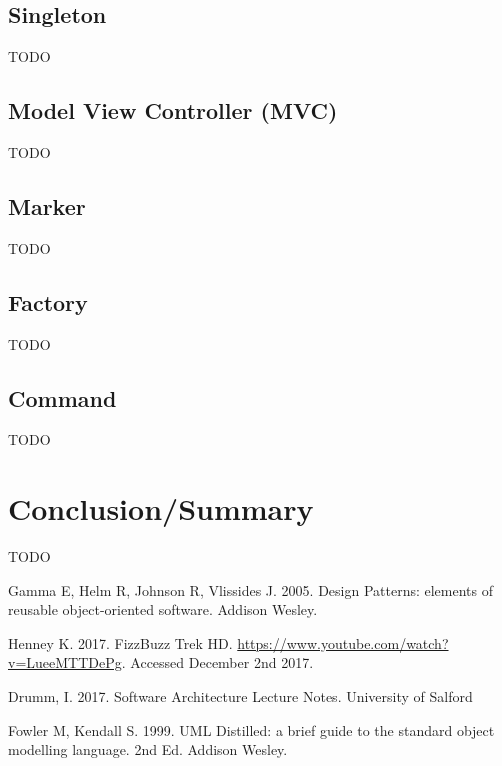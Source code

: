 \documentclass[a4paper,12pt]{article}
\begin{document}
\subsection*{Singleton}
TODO

\subsection*{Model View Controller (MVC)}
TODO

\subsection*{Marker}
TODO

\subsection*{Factory}
TODO

\subsection*{Command}
TODO

\section*{Conclusion/Summary}
TODO


\begin{thebibliography}{9}
	Gamma E, Helm R, Johnson R, Vlissides J. 2005. Design Patterns: elements of reusable object-oriented software. Addison Wesley.
	
	Henney K. 2017. FizzBuzz Trek HD. \url{https://www.youtube.com/watch?v=LueeMTTDePg}. Accessed December 2nd 2017.
	
	Drumm, I. 2017. Software Architecture Lecture Notes. University of Salford
	
	Fowler M, Kendall S. 1999. UML Distilled: a brief guide to the standard object modelling language. 2nd Ed. Addison Wesley.
\end{thebibliography}
\end{document}
